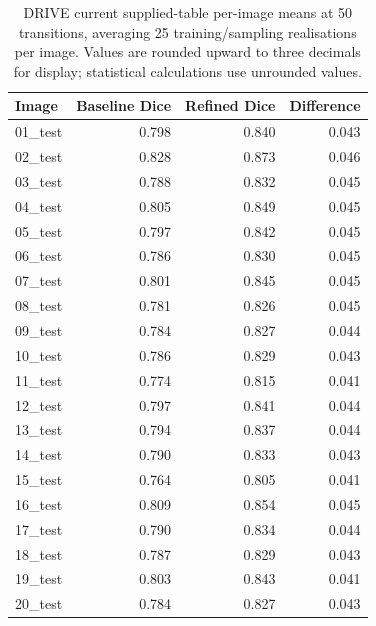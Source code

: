 \documentclass[jimaging,article,submit,pdftex,moreauthors]
  {Definitions/mdpi}
\begin{document}
\begin{table}[htbp]
\centering
\caption{DRIVE current supplied-table per-image means at 50 transitions, averaging 25 training/sampling realisations per image. Values are rounded upward to three decimals for display; statistical calculations use unrounded values.}
\label{tab:drive_per_image_supplied}
\scriptsize
\begin{tabular}{lrrr}
\toprule
Image & Baseline Dice & Refined Dice & Difference \\
\midrule
01\_test & 0.798 & 0.840 & 0.043 \\
02\_test & 0.828 & 0.873 & 0.046 \\
03\_test & 0.788 & 0.832 & 0.045 \\
04\_test & 0.805 & 0.849 & 0.045 \\
05\_test & 0.797 & 0.842 & 0.045 \\
06\_test & 0.786 & 0.830 & 0.045 \\
07\_test & 0.801 & 0.845 & 0.045 \\
08\_test & 0.781 & 0.826 & 0.045 \\
09\_test & 0.784 & 0.827 & 0.044 \\
10\_test & 0.786 & 0.829 & 0.043 \\
11\_test & 0.774 & 0.815 & 0.041 \\
12\_test & 0.797 & 0.841 & 0.044 \\
13\_test & 0.794 & 0.837 & 0.044 \\
14\_test & 0.790 & 0.833 & 0.043 \\
15\_test & 0.764 & 0.805 & 0.041 \\
16\_test & 0.809 & 0.854 & 0.045 \\
17\_test & 0.790 & 0.834 & 0.044 \\
18\_test & 0.787 & 0.829 & 0.043 \\
19\_test & 0.803 & 0.843 & 0.041 \\
20\_test & 0.784 & 0.827 & 0.043 \\
\bottomrule
\end{tabular}
\end{table}
\end{document}
